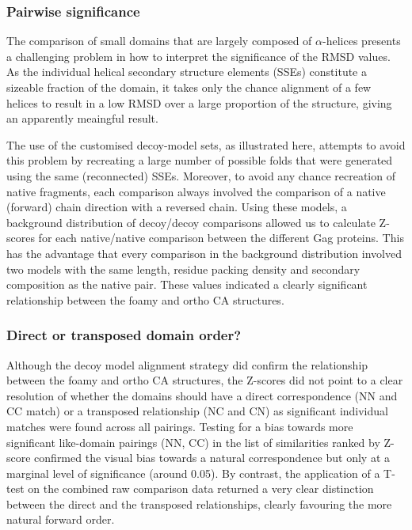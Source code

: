 \documentclass[preprint,12pt]{elsarticle}
\newcommand{\A}{$\alpha$}
\begin{document}
\subsubsection{Pairwise significance}

The comparison of small domains that are largely composed of \A-helices presents a challenging problem in how
to interpret the significance of the RMSD values.  As the individual helical secondary structure elements
(SSEs) constitute a sizeable fraction of the domain, it takes only the chance alignment of a few helices
to result in a low RMSD over a large proportion of the structure, giving an apparently meaingful result.

The use of the customised decoy-model sets, as illustrated here, attempts to avoid this problem by recreating
a large number of possible folds that were generated using the same (reconnected) SSEs. Moreover, to avoid any
chance recreation of native fragments, each comparison always involved the comparison of a native (forward)
chain direction with a reversed chain.  Using these models, a background distribution of decoy/decoy comparisons
allowed us to calculate Z-scores for each native/native comparison between the different Gag proteins. This has
the advantage that every comparison in the background distribution involved two models with the same length,
residue packing density and secondary composition as the native pair.  These values indicated a clearly
significant relationship between the foamy and ortho CA structures.

\subsubsection{Direct or transposed domain order?}

Although the decoy model alignment strategy did confirm the relationship between the foamy and ortho CA
structures, the Z-scores did not point to a clear resolution of whether the domains should have a direct
correspondence (NN and CC match) or a transposed relationship (NC and CN) as significant individual matches
were found across all pairings. Testing for a bias towards more significant like-domain pairings (NN, CC)
in the list of similarities ranked by Z-score confirmed the visual bias towards a natural correspondence
but only at a marginal level of significance (around 0.05). By contrast, the application of a T-test on the
combined raw comparison data returned a very clear distinction between the direct and the transposed
relationships, clearly favouring the more natural forward order.
\end{document}
